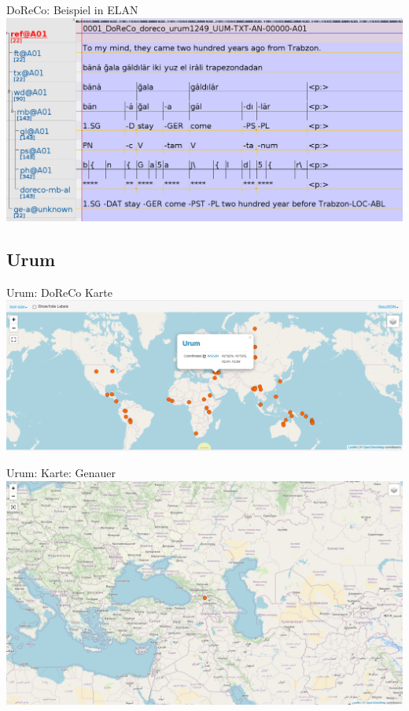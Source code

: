 \documentclass{beamer}
\begin{document}
\begin{frame}{DoReCo: Beispiel in ELAN}
\includegraphics[scale=0.45]{./pics/urum_doreco_elan_example.png}
\end{frame}

\subsection{Urum}

\begin{frame}{Urum: DoReCo Karte}
	\includegraphics[scale=0.3]{./pics/urum_map_doreco.png}
\end{frame}

\begin{frame}{Urum: Karte: Genauer}
	\includegraphics[scale=0.2]{./pics/urum_map_big.png}
\end{frame}
\end{document}
